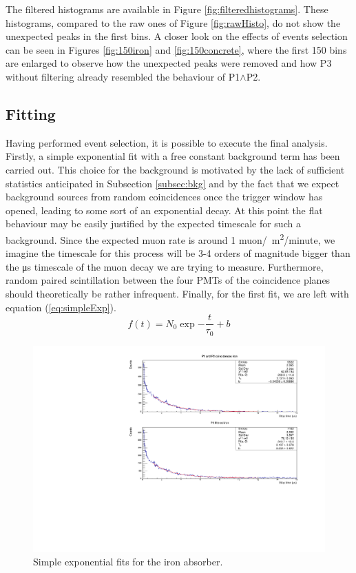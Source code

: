 \documentclass[../main.tex]{subfiles}
\begin{document}
The filtered histograms are available in Figure \ref{fig:filteredhistograms}. These histograms, compared to the raw ones of Figure \ref{fig:rawHisto}, do not show the unexpected peaks in the first bins. A closer look on the effects of events selection can be seen in Figures \ref{fig:150iron} and \ref{fig:150concrete}, where the first 150 bins are enlarged to observe how the unexpected peaks were removed and how P3 without filtering already resembled the behaviour of P1$\land$P2.

\subsection{Fitting}
\label{subsec:fitting}

Having performed event selection, it is possible to execute the final analysis. Firstly, a simple exponential fit with a free constant background term has been carried out. This choice for the background is motivated by the lack of sufficient statistics anticipated in Subsection \ref{subsec:bkg} and by the fact that we expect background sources from random coincidences once the trigger window has opened, leading to some sort of an exponential decay. At this point the flat behaviour may be easily justified by the expected timescale for such a background. Since the expected muon rate is around 1 muon/\si{\centi \square \metre }/minute, we imagine the timescale for this process will be 3-4 orders of magnitude bigger than the \si{\micro \second} timescale of the muon decay we are trying to measure. Furthermore, random paired scintillation between the four PMTs of the coincidence planes should theoretically be rather infrequent. Finally, for the first fit, we are left with equation (\ref{eq:simpleExp}).
\begin{equation}
    f(t)=N_0 \exp{-\frac{t}{\tau_0}}+b
    \label{eq:simpleExp}
\end{equation}

\begin{figure}[htb!]
    \centering
    \includegraphics[width=0.9\linewidth]{images/iron_filtered_fit.pdf}
    \caption{Simple exponential fits for the iron absorber.}
    \label{fig:ironFits}
\end{figure}
\end{document}
